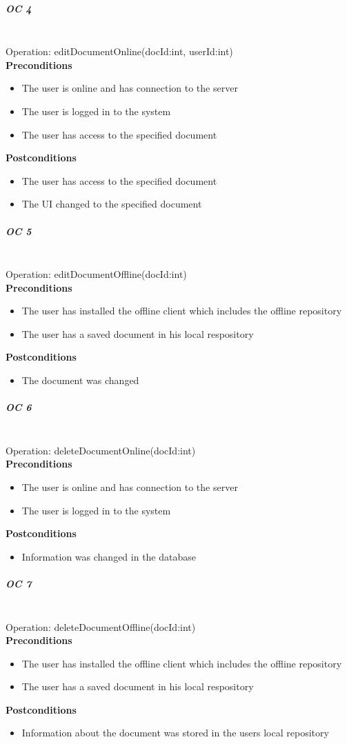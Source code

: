 \documentclass[a4paper,11pt,report]{report}
\begin{document}
\subparagraph{OC 4} \mbox{} \\
Operation: editDocumentOnline(docId:int, userId:int) \\
\textbf{Preconditions}
\begin{itemize}
\item The user is online and has connection to the server
\item The user is logged in to the system
\item The user has access to the specified document
\end{itemize} 
\textbf{Postconditions}
\begin{itemize}
\item The user has access to the specified document
\item The UI changed to the specified document
\end{itemize} 

\subparagraph{OC 5} \mbox{} \\
Operation: editDocumentOffline(docId:int) \\
\textbf{Preconditions}
\begin{itemize}
\item The user has installed the offline client which includes the offline repository
\item The user has a saved document in his local respository
\end{itemize} 
\textbf{Postconditions}
\begin{itemize}
\item The document was changed
\end{itemize} 

\subparagraph{OC 6} \mbox{} \\
Operation: deleteDocumentOnline(docId:int) \\
\textbf{Preconditions}
\begin{itemize}
\item The user is online and has connection to the server
\item The user is logged in to the system
\end{itemize} 
\textbf{Postconditions}
\begin{itemize}
\item Information was changed in the database
\end{itemize} 

\subparagraph{OC 7} \mbox{} \\
Operation: deleteDocumentOffline(docId:int) \\
\textbf{Preconditions}
\begin{itemize}
\item The user has installed the offline client which includes the offline repository
\item The user has a saved document in his local respository
\end{itemize} 
\textbf{Postconditions}
\begin{itemize}
\item Information about the document was stored in the users local repository
\end{itemize} 
\end{document}
